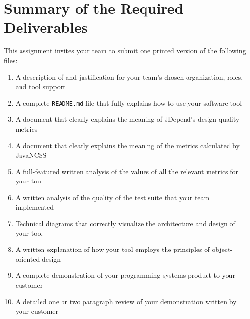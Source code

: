 \section*{Summary of the Required Deliverables}

This assignment invites your team to submit one printed version of the following files:

\vspace*{-.1in}
\begin{enumerate}
  \itemsep0em
  \item A description of and justification for your team's chosen organization, roles, and tool support
  \item A complete {\tt README.md} file that fully explains how to use your software tool
  \item A document that clearly explains the meaning of JDepend's design quality metrics
  \item A document that clearly explains the meaning of the metrics calculated by JavaNCSS
  \item A full-featured written analysis of the values of all the relevant metrics for your tool
  \item A written analysis of the quality of the test suite that your team implemented
  \item Technical diagrams that correctly visualize the architecture and design of your tool
  \item A written explanation of how your tool employs the principles of object-oriented design
  \item A complete demonstration of your programming systems product to your customer
  \item A detailed one or two paragraph review of your demonstration written by your customer
\end{enumerate}
\vspace*{-.1in}


